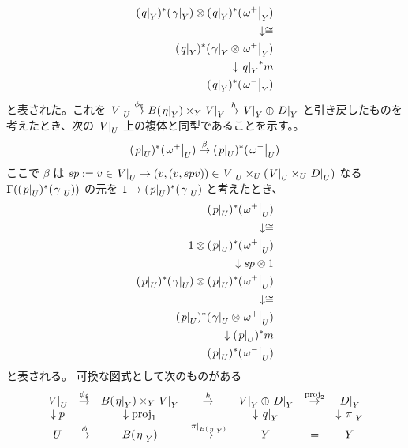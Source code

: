 \begin{Proof}
\begin{align*}
    (\left. {q} \right| _{Y})^*(\left. {\gamma} \right| _{Y}) \otimes (\left. {q} \right| _{Y})^*(\left. {\omega^{+}} \right| _{Y}) \\
    \downarrow \cong \\
    (\left. {q} \right| _{Y})^*(\left. {\gamma} \right| _{Y} \otimes \left. {\omega^{+}} \right| _{Y}) \\
    \downarrow {\left. {q} \right| _{Y}}^* m \\
    (\left. {q} \right| _{Y})^*(\left. {\omega^{-}} \right| _{Y})
  \end{align*}
  と表された。これを \(\left. {V} \right| _{U} \overset{\phi_{\xi}}{\to} B(\left. {\eta} \right| _{Y}) \times_{Y} \left. {V} \right| _{Y} \overset{h}{\to} \left. {V} \right| _{Y} \oplus \left. {D} \right| _{Y}\) と引き戻したものを考えたとき、次の \(\left. {V} \right| _{U}\) 上の複体と同型であることを示す。。
  \[
    (\left. {p} \right| _{U})^*(\left. {\omega^{+}} \right| _{U}) \overset{\beta}{\to} (\left. {p} \right| _{U})^*(\left. {\omega^{-}} \right| _{U})
  \]
  ここで \(\beta\) は \(sp := v \in \left. {V} \right| _{U} \to (v, (v, spv)) \in \left. {V} \right| _{U} \times_{U} (\left. {V} \right| _{U} \times_{U} \left. {D} \right| _{U})\) なる \(\Gamma((\left. {p} \right| _{U})^*(\left. {\gamma} \right| _{U}))\) の元を \(1 \to (\left. {p} \right| _{U})^*(\left. {\gamma} \right| _{U})\) と考えたとき、
  \begin{align*}
    (\left. {p} \right| _{U})^* (\left. {\omega^{+}} \right| _{U}) \\
    \downarrow \cong \\
    1 \otimes (\left. {p} \right| _{U})^* (\left. {\omega^{+}} \right| _{U}) \\
    \downarrow sp \otimes 1 \\
    (\left. {p} \right| _{U})^* (\left. {\gamma} \right| _{U}) \otimes (\left. {p} \right| _{U})^* (\left. {\omega^{+}} \right| _{U}) \\
    \downarrow \cong \\
    (\left. {p} \right| _{U})^* (\left. {\gamma} \right| _{U} \otimes \left. {\omega^{+}} \right| _{U}) \\
    \downarrow (\left. {p} \right| _{U})^* m \\
    (\left. {p} \right| _{U})^* (\left. {\omega^{-}} \right| _{U})
  \end{align*}
  と表される。
\itemthen
  可換な図式として次のものがある
  \[\begin{matrix}
    \left. {V} \right| _{U} & \overset{\phi_{\xi}}{\to} & B(\left. {\eta} \right| _{Y}) \times_{Y} \left. {V} \right| _{Y} & \overset{h}{\to} & \left. {V} \right| _{Y} \oplus \left. {D} \right| _{Y} & \overset{\text{proj}_2}{\to} & \left. {D} \right| _{Y} \\
    \downarrow p & & \downarrow \text{proj}_1 & & \downarrow \left. {q} \right| _{Y} & & \downarrow \left. {\pi} \right| _{Y} \\
    U & \overset{\phi}{\to} & B(\left. {\eta} \right| _{Y}) & \overset{\left. {\pi} \right| _{B(\left. {\eta} \right| _{Y})}}{\to} & Y & = & Y
  \end{matrix}\]

\end{Proof}
